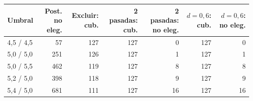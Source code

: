 \begin{tabular}{lrrrrrr}
\toprule
\textbf{Umbral} & \textbf{Post. no eleg.} & \textbf{Excluir: cub.} & \textbf{2 pasadas: cub.} & \textbf{2 pasadas: no eleg.} & \textbf{$d=0{,}6$: cub.} & \textbf{$d=0{,}6$: no eleg.} \\
\midrule
4,5 / 4,5 & 57 & 127 & 127 & 0 & 127 & 0 \\
5,0 / 5,0 & 251 & 126 & 127 & 1 & 127 & 1 \\
5,0 / 5,5 & 462 & 119 & 127 & 8 & 127 & 8 \\
5,2 / 5,0 & 398 & 118 & 127 & 9 & 127 & 9 \\
5,4 / 5,0 & 681 & 111 & 127 & 16 & 127 & 16 \\
\bottomrule
\end{tabular}
